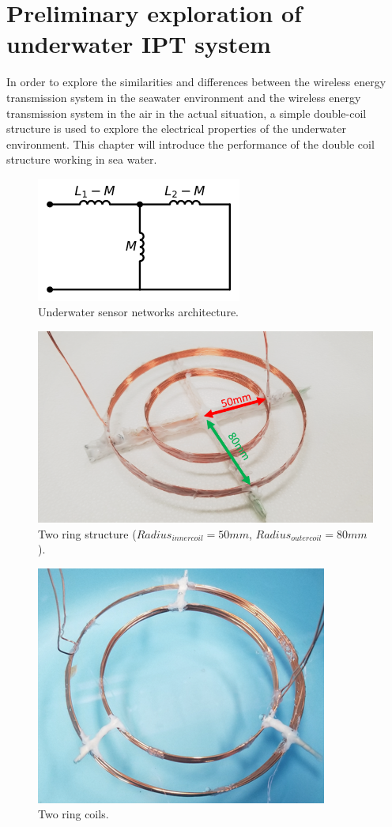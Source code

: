 \chapter{Preliminary exploration of underwater IPT system}

In order to explore the similarities and differences between the wireless energy transmission system in the seawater environment and the wireless energy transmission system in the air in the actual situation, a simple double-coil structure is used to explore the electrical properties of the underwater environment. This chapter will introduce the performance of the double coil structure working in sea water.

\begin{figure}[htbp]
    \centering
    \includegraphics[width=0.4\linewidth]{images/3_mutual_inductance.png}
    \caption{Underwater sensor networks architecture.}
    \label{fig:3_mutual_inductance}
\end{figure}

\begin{figure}[htbp]
    \centering
    \includegraphics[width=0.7\linewidth]{images/3_two_ring_coil_5cm_8cm.png}
    \caption{Two ring structure ($Radius_{inner coil}=50mm$, $Radius_{outer coil}=80mm$).}
    \label{fig:3_two_ring_coil_5cm_8cm}
\end{figure}

\begin{figure}[htbp]
    \centering
    \includegraphics[width=0.5\linewidth]{images/3_two_ring_coil.png}
    \caption{Two ring coils.}
    \label{fig:3_two_ring_coil}
\end{figure}

